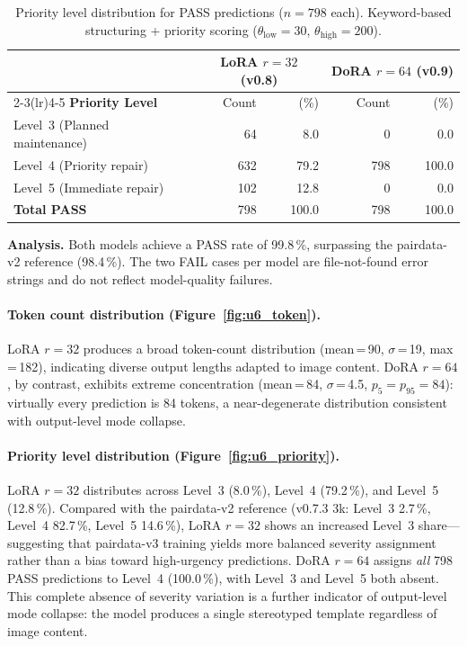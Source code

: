 \documentclass[onecolumn]{article}
\begin{document}
\begin{table}[h]
\centering
\caption{Priority level distribution for PASS predictions ($n=798$ each).
         Keyword-based structuring + priority scoring
         ($\theta_{\mathrm{low}}=30$, $\theta_{\mathrm{high}}=200$).}
\label{tab:u6_priority}
\setlength{\tabcolsep}{4pt}
\small
\begin{tabular}{lrrrr}
\toprule
 & \multicolumn{2}{c}{LoRA $r{=}32$ (v0.8)} & \multicolumn{2}{c}{DoRA $r{=}64$ (v0.9)} \\
\cmidrule(lr){2-3}\cmidrule(lr){4-5}
\textbf{Priority Level} & Count & (\%) & Count & (\%) \\
\midrule
Level~3 (Planned maintenance) &  64 &  8.0 &   0 &  0.0 \\
Level~4 (Priority repair)     & 632 & 79.2 & 798 & 100.0 \\
Level~5 (Immediate repair)    & 102 & 12.8 &   0 &  0.0 \\
\midrule
\textbf{Total PASS}           & 798 & 100.0 & 798 & 100.0 \\
\bottomrule
\end{tabular}
\end{table}

\noindent\textbf{Analysis.}
Both models achieve a PASS rate of 99.8\,\%, surpassing the pairdata-v2
reference (98.4\,\%).  The two FAIL cases per model are file-not-found
error strings and do not reflect model-quality failures.

\paragraph{Token count distribution (Figure~\ref{fig:u6_token}).}
LoRA $r{=}32$ produces a broad token-count distribution
(mean\,=\,90, $\sigma$\,=\,19, max\,=\,182), indicating diverse
output lengths adapted to image content.
DoRA $r{=}64$, by contrast, exhibits extreme concentration
(mean\,=\,84, $\sigma$\,=\,4.5, $p_5=p_{95}=84$): virtually every
prediction is 84 tokens, a near-degenerate distribution consistent
with output-level mode collapse.

\paragraph{Priority level distribution (Figure~\ref{fig:u6_priority}).}
LoRA $r{=}32$ distributes across Level~3 (8.0\,\%), Level~4 (79.2\,\%),
and Level~5 (12.8\,\%).  Compared with the pairdata-v2 reference
(v0.7.3 3k: Level~3 2.7\,\%, Level~4 82.7\,\%, Level~5 14.6\,\%),
LoRA $r{=}32$ shows an increased Level~3 share---suggesting
that pairdata-v3 training yields more balanced severity assignment
rather than a bias toward high-urgency predictions.
DoRA $r{=}64$ assigns \emph{all} 798 PASS predictions to Level~4
(100.0\,\%), with Level~3 and Level~5 both absent.
This complete absence of severity variation is a further indicator of
output-level mode collapse: the model produces a single stereotyped
template regardless of image content.
\end{document}
